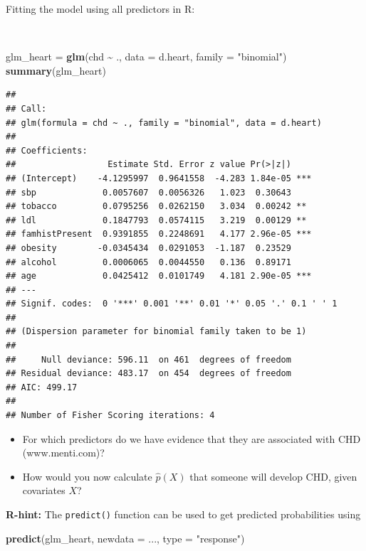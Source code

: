 \documentclass[
  10pt,
  ignorenonframetext,
]{beamer}
\newenvironment{Shaded}{\begin{snugshade}}{\end{snugshade}}
\newcommand{\AttributeTok}[1]{\textcolor[rgb]{0.13,0.29,0.53}{#1}}
\newcommand{\FunctionTok}[1]{\textcolor[rgb]{0.13,0.29,0.53}{\textbf{#1}}}
\newcommand{\NormalTok}[1]{#1}
\newcommand{\OtherTok}[1]{\textcolor[rgb]{0.56,0.35,0.01}{#1}}
\newcommand{\SpecialCharTok}[1]{\textcolor[rgb]{0.81,0.36,0.00}{\textbf{#1}}}
\newcommand{\StringTok}[1]{\textcolor[rgb]{0.31,0.60,0.02}{#1}}
\begin{document}
\begin{frame}[fragile]
Fitting the model using all predictors in R:

\(~\)

\tiny

\begin{Shaded}
\begin{Highlighting}[]
\NormalTok{glm\_heart }\OtherTok{=} \FunctionTok{glm}\NormalTok{(chd }\SpecialCharTok{\textasciitilde{}}\NormalTok{ ., }\AttributeTok{data =}\NormalTok{ d.heart, }\AttributeTok{family =} \StringTok{"binomial"}\NormalTok{)}
\FunctionTok{summary}\NormalTok{(glm\_heart)}
\end{Highlighting}
\end{Shaded}

\begin{verbatim}
## 
## Call:
## glm(formula = chd ~ ., family = "binomial", data = d.heart)
## 
## Coefficients:
##                  Estimate Std. Error z value Pr(>|z|)    
## (Intercept)    -4.1295997  0.9641558  -4.283 1.84e-05 ***
## sbp             0.0057607  0.0056326   1.023  0.30643    
## tobacco         0.0795256  0.0262150   3.034  0.00242 ** 
## ldl             0.1847793  0.0574115   3.219  0.00129 ** 
## famhistPresent  0.9391855  0.2248691   4.177 2.96e-05 ***
## obesity        -0.0345434  0.0291053  -1.187  0.23529    
## alcohol         0.0006065  0.0044550   0.136  0.89171    
## age             0.0425412  0.0101749   4.181 2.90e-05 ***
## ---
## Signif. codes:  0 '***' 0.001 '**' 0.01 '*' 0.05 '.' 0.1 ' ' 1
## 
## (Dispersion parameter for binomial family taken to be 1)
## 
##     Null deviance: 596.11  on 461  degrees of freedom
## Residual deviance: 483.17  on 454  degrees of freedom
## AIC: 499.17
## 
## Number of Fisher Scoring iterations: 4
\end{verbatim}

\begin{itemize}
\item
  For which predictors do we have evidence that they are associated with
  CHD (www.menti.com)?
\item
  How would you now calculate \(\hat{p}(X)\) that someone will develop
  CHD, given covariates \(X\)?
\end{itemize}

\vspace{5mm}

\textbf{R-hint:} The \texttt{predict()} function can be used to get
predicted probabilities using

\scriptsize

\begin{Shaded}
\begin{Highlighting}[]
\FunctionTok{predict}\NormalTok{(glm\_heart, }\AttributeTok{newdata =}\NormalTok{ ..., }\AttributeTok{type =} \StringTok{"response"}\NormalTok{)}
\end{Highlighting}
\end{Shaded}
\end{frame}
\end{document}
